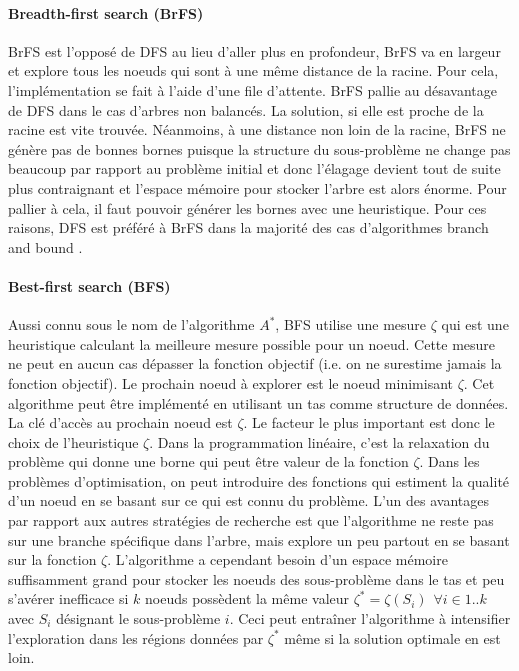 \documentclass[12pt,a4paper,oneside]{book}
\theoremstyle{definition}
\begin{document}
	
	\paragraph{Breadth-first search (BrFS)}
	BrFS est l'opposé de DFS au lieu d'aller plus en profondeur, BrFS va en largeur et explore tous les noeuds qui sont à une même distance de la racine. Pour cela, l'implémentation se fait à l'aide d'une file d'attente. BrFS pallie au désavantage de DFS dans le cas d'arbres non balancés. La solution, si elle est proche de la racine est vite trouvée. Néanmoins, à une distance non loin de la racine, BrFS ne génère pas de bonnes bornes puisque la structure du sous-problème ne change pas beaucoup par rapport au problème initial et donc l'élagage devient tout de suite plus contraignant et l'espace mémoire pour stocker l'arbre est alors énorme. Pour pallier à cela, il faut pouvoir générer les bornes avec une heuristique. Pour ces raisons, DFS est préféré à BrFS dans la majorité des cas d'algorithmes branch and bound \cite{MORRISON201679}. 
	
	
	\paragraph{Best-first search (BFS)}
	Aussi connu sous le nom de l'algorithme $A^*$, BFS utilise une mesure $\zeta$ qui est une heuristique calculant la meilleure mesure possible pour un noeud. Cette mesure ne peut en aucun cas dépasser la fonction objectif (i.e. on ne surestime jamais la fonction objectif). Le prochain noeud à explorer est le noeud minimisant $\zeta$. Cet algorithme peut être implémenté en utilisant un tas comme structure de données. La clé d'accès au prochain noeud est $\zeta$. Le facteur le plus important est donc le choix de l'heuristique $\zeta$. Dans la programmation linéaire, c'est la relaxation du problème qui donne une borne qui peut être valeur de la fonction $\zeta$. Dans les problèmes d'optimisation, on peut introduire des fonctions qui estiment la qualité d'un noeud en se basant sur ce qui est connu du problème. L'un des avantages par rapport aux autres stratégies de recherche est que l'algorithme ne reste pas sur une branche spécifique dans l'arbre, mais explore un peu partout en se basant sur la fonction $\zeta$. L'algorithme a cependant besoin d'un espace mémoire suffisamment grand pour stocker les noeuds des sous-problème dans le tas et peu s'avérer inefficace si $k$ noeuds possèdent la même valeur $\zeta^* = \zeta(S_i) \hspace{5pt} \forall i \in 1..k$ avec $S_i$ désignant le sous-problème $i$. Ceci peut entraîner l'algorithme à intensifier l'exploration dans les régions données par $\zeta^*$ même si la solution optimale en est loin.  
\end{document}
